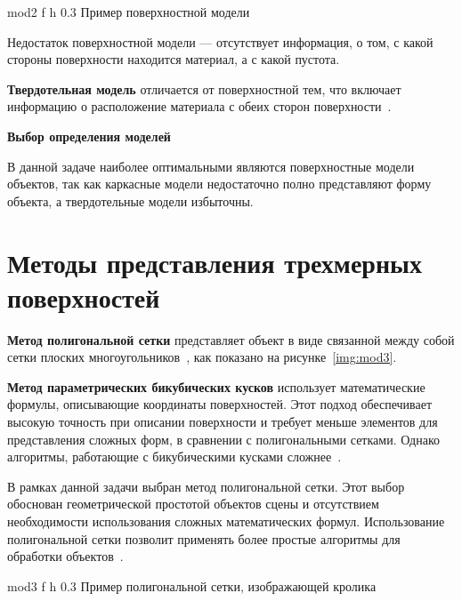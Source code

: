 	{mod2} %
	{f} %
	{h} %
	{0.3\textwidth} %
	{Пример поверхностной модели} %


Недостаток поверхностной модели --- отсутствует информация, о том, с какой стороны поверхности находится материал, а с какой пустота.

\textbf{Твердотельная модель} отличается от поверхностной тем, что включает информацию о расположение материала с обеих сторон поверхности~\cite{model_geom_01}.

\textbf{Выбор определения моделей} 

В данной задаче наиболее оптимальными являются поверхностные модели объектов, так как каркасные модели недостаточно полно представляют форму объекта, а твердотельные модели избыточны.


\section{Методы представления трехмерных поверхностей}

\textbf{Метод полигональной сетки} представляет объект в виде связанной между собой сетки плоских многоугольников~\cite{model_geom}, как показано на рисунке~\ref{img:mod3}.

\textbf{Метод параметрических бикубических кусков} использует математические формулы, описывающие координаты поверхностей.
Этот подход обеспечивает высокую точность при описании поверхности и требует меньше элементов для представления сложных форм, в сравнении с полигональными сетками.
Однако алгоритмы, работающие с бикубическими кусками сложнее~\cite{model_geom}.

В рамках данной задачи выбран метод полигональной сетки. Этот выбор обоснован геометрической простотой объектов сцены и отсутствием необходимости использования сложных математических формул.
Использование полигональной сетки позволит применять более простые алгоритмы для обработки объектов~\cite{model_geom}.

	{mod3} %
	{f} %
	{h} %
	{0.3\textwidth} %
	{Пример полигональной сетки, изображающей кролика} %


